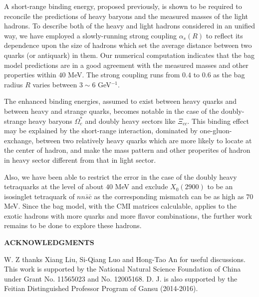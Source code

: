 \documentclass[prt,twocolumn,floatfix,nofootinbib]{revtex4}
\begin{document}
A short-range binding energy, proposed previously, is shown to be required to reconcile the predictions of heavy baryons and the measured masses of the light hadrons. To describe both of the heavy and light hadrons considered in an unified way, we have employed a slowly-running strong coupling $\alpha_{s}(R)$ to reflect its dependence upon the size of hadrons which set the average distance between two quarks (or antiquark) in them. Our numerical computation indicates that the bag model predictions are in a good agreement with the measured masses and other properties within $40$ MeV. The strong coupling runs from $0.4$ to $0.6$ as the bag radius $R$ varies between $3\sim 6$ GeV$^{-1}$.

The enhanced binding energies, assumed to exist between heavy quarks and between heavy and strange quarks, becomes notable in the case of the doubly-strange heavy baryons $\Omega_{c}^{\ast}$ and doubly heavy sectors like $\Xi_{cc}$. This binding effect may be explained by the short-range interaction, dominated by one-gluon-exchange, between two relatively heavy quarks which are more likely to locate at the center of hadron, and make the mass pattern and other properites of hadron in heavy sector different from that in light sector.

Also, we have been able to restrict the error in the case of the doubly heavy tetraquarks at the level of about $40$ MeV and exclude $X_{0}(2900)$ to be an isosinglet tetraquark of $nn\bar{s}\bar{c}$ as the corresponding mismatch can be  as high as $70$ MeV. Since the bag model, with the CMI matrices calculable, applies to the exotic hadrons with more quarks and more flavor combinations, the further work remains to be done to explore these hadrons.

\medskip
\textbf{ACKNOWLEDGMENTS}

W. Z thanks Xiang Liu, Si-Qiang Luo and Hong-Tao An for useful discussions.
This work is supported by the National Natural Science Foundation of China under Grant No. 11565023 and No. 12005168.
D. J. is also supported by the Feitian Distinguished Professor Program of Gansu (2014-2016).


\medskip
\end{document}
